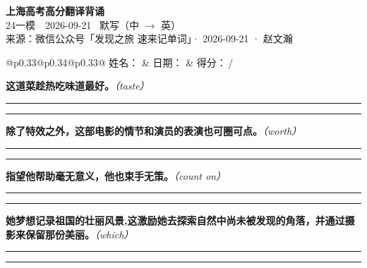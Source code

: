\documentclass[11pt,a4paper]{article}
\newcommand{\num}[1]{\makebox[1.9em][r]{#1.}\hspace{0.3em}}
\newcommand{\wline}{\noindent\rule{\linewidth}{0.4pt}}
\newcommand{\prompt}[1]{\emph{\textcolor{tipblue}{\small（#1）}}}
\begin{document}
\pagestyle{plain}
\begin{center}
{\LARGE\bfseries 上海高考高分翻译背诵 }\\[0.25em]
{\large 24一模　2026-09-21 \quad\ 默写（中 $\to$ 英）}\\[0.35em]
{\footnotesize 来源：微信公众号「发现之旅 速来记单词」· 2026-09-21 · 赵文瀚}
\end{center}

\vspace{0.4em}
\noindent\begin{tabular}{@{}p{0.33\textwidth}@{}p{0.34\textwidth}@{}p{0.33\textwidth}@{}}
姓名：\underline{\hspace{2.0cm}} & 日期：\underline{\hspace{2.0cm}} & 得分：\underline{\hspace{1.4cm}}\,/ \\
\end{tabular}

\vspace{0.5em}

\vspace{0.8em}
\num{1}\textbf{这道菜趁热吃味道最好。}\prompt{taste}

\vspace{0.3em}

\wline\vspace{0.3em}
\wline

\num{2}\textbf{除了特效之外，这部电影的情节和演员的表演也可圈可点。}\prompt{worth}

\vspace{0.3em}

\wline\vspace{0.3em}
\wline

\num{3}\textbf{指望他帮助毫无意义，他也束手无策。}\prompt{count on}

\vspace{0.3em}

\wline\vspace{0.3em}
\wline

\num{4}\textbf{她梦想记录祖国的壮丽风景,这激励她去探索自然中尚未被发现的角落，并通过摄影来保留那份美丽。}\prompt{which}

\vspace{0.3em}

\wline\vspace{0.3em}
\wline
\end{document}
